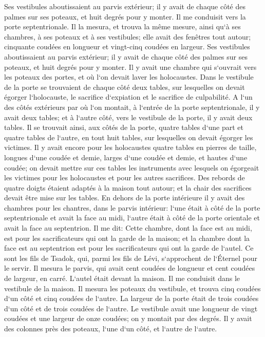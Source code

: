 \verse Ses vestibules aboutissaient au parvis extérieur; il y avait de chaque côté des palmes sur ses poteaux, et huit degrés pour y monter. 
\verse Il me conduisit vers la porte septentrionale. Il la mesura, et trouva la même mesure, 
\verse ainsi qu`à ses chambres, à ses poteaux et à ses vestibules; elle avait des fenêtres tout autour; cinquante coudées en longueur et vingt-cinq coudées en largeur. 
\verse Ses vestibules aboutissaient au parvis extérieur; il y avait de chaque côté des palmes sur ses poteaux, et huit degrés pour y monter. 
\verse Il y avait une chambre qui s`ouvrait vers les poteaux des portes, et où l`on devait laver les holocaustes. 
\verse Dans le vestibule de la porte se trouvaient de chaque côté deux tables, sur lesquelles on devait égorger l`holocauste, le sacrifice d`expiation et le sacrifice de culpabilité. 
\verse A l`un des côtés extérieurs par où l`on montait, à l`entrée de la porte septentrionale, il y avait deux tables; et à l`autre côté, vers le vestibule de la porte, il y avait deux tables. 
\verse Il se trouvait ainsi, aux côtés de la porte, quatre tables d`une part et quatre tables de l`autre, en tout huit tables, sur lesquelles on devait égorger les victimes. 
\verse Il y avait encore pour les holocaustes quatre tables en pierres de taille, longues d`une coudée et demie, larges d`une coudée et demie, et hautes d`une coudée; on devait mettre sur ces tables les instruments avec lesquels on égorgeait les victimes pour les holocaustes et pour les autres sacrifices. 
\verse Des rebords de quatre doigts étaient adaptés à la maison tout autour; et la chair des sacrifices devait être mise sur les tables. 
\verse En dehors de la porte intérieure il y avait des chambres pour les chantres, dans le parvis intérieur: l`une était à côté de la porte septentrionale et avait la face au midi, l`autre était à côté de la porte orientale et avait la face au septentrion. 
\verse Il me dit: Cette chambre, dont la face est au midi, est pour les sacrificateurs qui ont la garde de la maison; 
\verse et la chambre dont la face est au septentrion est pour les sacrificateurs qui ont la garde de l`autel. Ce sont les fils de Tsadok, qui, parmi les fils de Lévi, s`approchent de l`Éternel pour le servir. 
\verse Il mesura le parvis, qui avait cent coudées de longueur et cent coudées de largeur, en carré. L`autel était devant la maison. 
\verse Il me conduisit dans le vestibule de la maison. Il mesura les poteaux du vestibule, et trouva cinq coudées d`un côté et cinq coudées de l`autre. La largeur de la porte était de trois coudées d`un côté et de trois coudées de l`autre. 
\verse Le vestibule avait une longueur de vingt coudées et une largeur de onze coudées; on y montait par des degrés. Il y avait des colonnes près des poteaux, l`une d`un côté, et l`autre de l`autre. 

